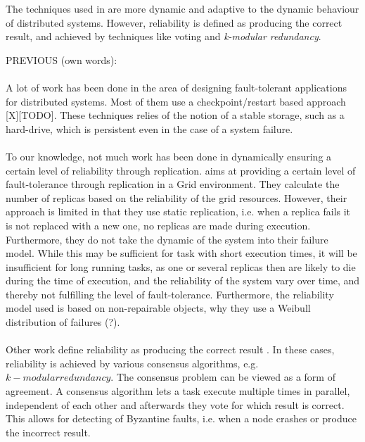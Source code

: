 \documentclass{cslthse-msc}
\begin{document}
The techniques used in \cite{selfAdaptRel} \cite{dynAdaptRepl} are more dynamic and adaptive to the dynamic behaviour of distributed systems. However, reliability is defined as producing the correct result, and achieved by techniques like voting and \emph{k-modular redundancy}.



\iffalse %
\newpage
PREVIOUS (own words):
\\\\
A lot of work has been done in the area of designing fault-tolerant applications for distributed systems. Most of them use a checkpoint/restart based approach [X][TODO]. These techniques relies of the notion of a stable storage, such as a hard-drive, which is persistent even in the case of a system failure.
\\\\
To our knowledge, not much work has been done in dynamically ensuring a certain level of reliability through replication.\cite{effTaskReplMobGrid} aims at providing a certain level of fault-tolerance through replication in a Grid environment. They calculate the number of replicas based on the reliability of the grid resources. However, their approach is limited in that they use static replication, i.e. when a replica fails it is not replaced with a new one, no replicas are made during execution. Furthermore, they do not take the dynamic of the system into their failure model. While this may be sufficient for task with short execution times, it will be insufficient for long running tasks, as one or several replicas then are likely to die during the time of execution, and the reliability of the system vary over time, and thereby not fulfilling the level of fault-tolerance. Furthermore, the reliability model used is based on non-repairable objects, why they use a Weibull distribution of failures (?).
\\\\
Other work define reliability as producing the correct result \cite{selfAdaptRel} \cite{imprRelAdaptRL} \cite{X}. In these cases, reliability is achieved by various consensus algorithms, e.g. $k-modular redundancy$. The consensus problem can be viewed as a form of agreement. A consensus algorithm lets a task execute multiple times in parallel, independent of each other and afterwards they vote for which result is correct. This allows for detecting of Byzantine faults, i.e. when a node crashes or produce the incorrect result.
\\\\
\end{document}

